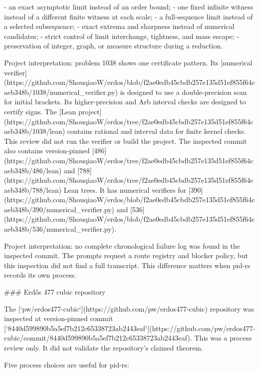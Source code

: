 \documentclass[11pt]{article}
\begin{document}
\begin{markdown}
- an exact asymptotic limit instead of an order bound;
- one fixed infinite witness instead of a different finite witness at each scale;
- a full-sequence limit instead of a selected subsequence;
- exact extrema and sharpness instead of numerical candidates;
- strict control of limit interchange, tightness, and mass escape;
- preservation of integer, graph, or measure structure during a reduction.

Project interpretation: problem 1038 shows one certificate pattern. Its
[numerical verifier](https://github.com/ShouqiaoW/erdos/blob/f2ae0edb45cbdb257e135d51ef855f64caeb348b/1038/numerical_verifier.py)
is designed to use a double-precision scan for initial brackets. Its higher-precision and Arb
interval checks are designed to certify signs. The
[Lean project](https://github.com/ShouqiaoW/erdos/tree/f2ae0edb45cbdb257e135d51ef855f64caeb348b/1038/lean)
contains rational and interval data for finite kernel checks. This review did not run the verifier
or build the project. The inspected commit also contains version-pinned
[486](https://github.com/ShouqiaoW/erdos/tree/f2ae0edb45cbdb257e135d51ef855f64caeb348b/486/lean)
and
[788](https://github.com/ShouqiaoW/erdos/tree/f2ae0edb45cbdb257e135d51ef855f64caeb348b/788/lean)
Lean trees. It has numerical verifiers for
[390](https://github.com/ShouqiaoW/erdos/blob/f2ae0edb45cbdb257e135d51ef855f64caeb348b/390/numerical_verifier.py)
and
[536](https://github.com/ShouqiaoW/erdos/blob/f2ae0edb45cbdb257e135d51ef855f64caeb348b/536/numerical_verifier.py).

Project interpretation: no complete chronological failure log was found in the inspected commit.
The prompts request a route registry and blocker policy, but this inspection did not find a full
transcript. This difference matters when pid-rs records its own process.

### Erdős 477 cubic repository

The [`pw/erdos477-cubic`](https://github.com/pw/erdos477-cubic) repository was inspected at
version-pinned commit
[`8440d599890b5a5ef7b212c65338723ab2443eaf`](https://github.com/pw/erdos477-cubic/commit/8440d599890b5a5ef7b212c65338723ab2443eaf).
This was a process review only. It did not validate the repository's claimed theorem.

Five process choices are useful for pid-rs:


\end{markdown}
\end{document}
